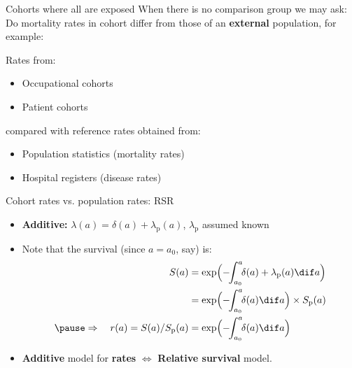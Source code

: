 \begin{frame}{Cohorts where all are exposed}
When there is no comparison group we may ask:\\
Do mortality rates in cohort differ from those of an
\textbf{external} population, for example:

\pause
Rates from:
\begin{itemize}
\item Occupational cohorts
\item Patient cohorts
\end{itemize}
\pause
compared with reference rates obtained from:
\begin{itemize}
\item Population statistics (mortality rates)
\item Hospital registers (disease rates)
\end{itemize}
\end{frame}

\begin{frame}{Cohort rates vs. population rates: RSR}
  \begin{itemize}[<+->]
  \item \textbf{Additive:} $\lambda(a) = \delta(a) +
    \lambda_\text{p}(a)$, \quad $\lambda_\text{p}$ assumed known
  \item Note that the survival (since $a=a_0$, say) is: \vspace*{-1ex}
\begin{align*}
     S(a) &= \exp\Bigl(-\!\!\int_{a_0}^a\!\! \delta(a) + \lambda_\text{p}(a) \dif a\Bigr)\\
          &= \exp\Bigl(-\!\!  \int_{a_0}^a\!\! \delta(a) \dif a\Bigr) \times S_\text{p}(a)\\
    \pause \Rightarrow \quad
    r(a) = S(a)/S_\text{p}(a) &= \exp\Bigl(-\!\!\int_{a_0}^a\!\! \delta(a) \dif a\Bigr)
  \end{align*}
    \pause
  \item \textbf{Additive} model for \textbf{rates} $\Leftrightarrow$ \textbf{Relative survival} model.
  \end{itemize}
\end{frame}

